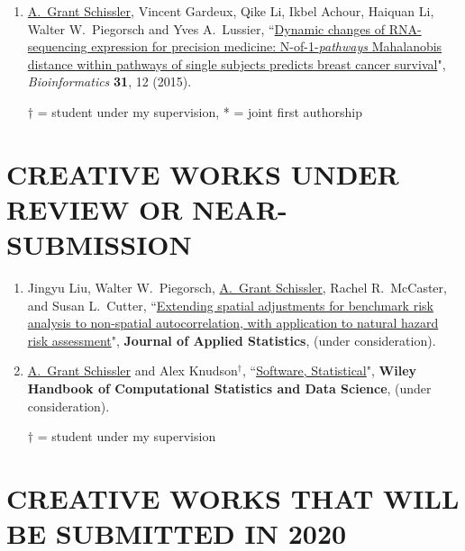 \documentclass[paper=a4,fontsize=11pt]{scrartcl} %
\newcommand{\NewPart}[2]{\section*{\uppercase{#1} #2 }}
\newcommand{\PaperEntry}[7]{
		\noindent #1, ``\href{#7}{#2}", \textit{#3} \textbf{#4}, #5 (#6).}
\begin{document}
\begin{enumerate}
\item \PaperEntry{\underline{A.~Grant Schissler}, Vincent Gardeux, Qike Li, Ikbel Achour, Haiquan Li, Walter W.~Piegorsch and Yves A.~Lussier}{Dynamic changes of RNA-sequencing expression for precision medicine: N-of-1-\textit{pathways} Mahalanobis distance within pathways of single subjects predicts breast cancer survival}{Bioinformatics}{31}{12}{2015}{http://bioinformatics.oxfordjournals.org/content/31/12/i293.full}

  $\dagger$ = student under my supervision, * = joint first authorship
\end{enumerate}


\NewPart{Creative works under review or near-submission}{}
\vspace{-7pt}
\begin{enumerate}

\item \PaperEntry{Jingyu Liu, Walter W.~Piegorsch, \underline{A.~Grant Schissler}, Rachel R.~McCaster, and Susan L.~Cutter}{Extending spatial adjustments for benchmark risk analysis to non-spatial autocorrelation, with application to natural hazard risk assessment}{}{Journal of Applied Statistics}{}{under consideration}{}

\item \PaperEntry{\underline{A.~Grant Schissler} and Alex Knudson$^{\dagger}$}{Software, Statistical}{}{Wiley Handbook of Computational Statistics and Data Science}{}{under consideration}{}

  $\dagger$ = student under my supervision
  
\end{enumerate}

\NewPart{Creative works that will be submitted in 2020}{}
\vspace{-7pt}
\end{document}
